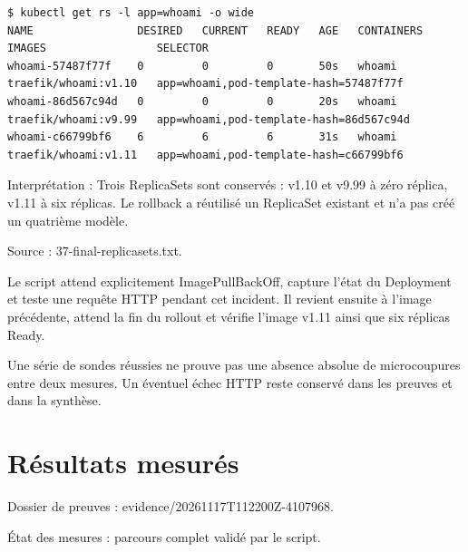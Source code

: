 \documentclass[11pt,a4paper]{article}
\begin{document}
\par\medskip\noindent\begin{minipage}{\linewidth}
\par\vspace{4pt}\noindent\begin{minipage}{\linewidth}
\begin{Verbatim}[breaklines=true,breakanywhere=true,fontsize=\footnotesize,frame=single,framesep=8pt,rulecolor=\color{teal}]
$ kubectl get rs -l app=whoami -o wide
NAME                DESIRED   CURRENT   READY   AGE   CONTAINERS   IMAGES                 SELECTOR
whoami-57487f77f    0         0         0       50s   whoami       traefik/whoami:v1.10   app=whoami,pod-template-hash=57487f77f
whoami-86d567c94d   0         0         0       20s   whoami       traefik/whoami:v9.99   app=whoami,pod-template-hash=86d567c94d
whoami-c66799bf6    6         6         6       31s   whoami       traefik/whoami:v1.11   app=whoami,pod-template-hash=c66799bf6
\end{Verbatim}
\end{minipage}\par\vspace{6pt}

Interprétation : Trois ReplicaSets sont conservés : v1.10 et v9.99 à zéro réplica, v1.11 à six réplicas. Le rollback a réutilisé un ReplicaSet existant et n'a pas créé un quatrième modèle.

{\footnotesize\color{teal} Source : 37-final-replicasets.txt.\par}
\end{minipage}\par\medskip

Le script attend explicitement ImagePullBackOff, capture l'état du Deployment et teste une
requête HTTP pendant cet incident. Il revient ensuite à l'image précédente, attend la fin du
rollout et vérifie l'image v1.11 ainsi que six réplicas Ready.

Une série de sondes réussies ne prouve pas une absence absolue de microcoupures entre deux
mesures. Un éventuel échec HTTP reste conservé dans les preuves et dans la synthèse.

\section{Résultats mesurés}

Dossier de preuves : evidence/20261117T112200Z-4107968.

État des mesures : parcours complet validé par le script.
\end{document}
